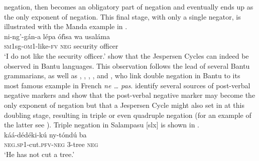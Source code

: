 \documentclass[output=paper]{langscibook}
\begin{document}
negation, then becomes an obligatory part of negation and eventually ends
up as the only exponent of negation. This final stage, with only a single
negator, is illustrated with the Manda example in
.  
\ea\label{ex:manda-security}
\\ 
\gll ni-ng'-g{\'a}n-a l{\'e}pa {{\'o}f{\'\i}sa wa usal{\'a}ma}\\
\textsc{sm1}sg-\textsc{om}1-like-\textsc{fv} \textsc{neg} {security
officer}\\ \glt `I do not like the security officer.' \z
\citet{DevosAuwera2013} show that the Jespersen Cycles can indeed be
observed in Bantu languages. This observation follows the lead of several
Bantu grammarians, as well as \citet[256--258]{Guldemann1996},
\citet[7]{GuldemannHagemeijer2006}, \citet[165]{Guldemann2008},
\citet[57]{Nurse2008}, and \citet[117]{Guldemann2011}, who link double
negation in Bantu to its most famous example in French \textit{ne \ldots{}
pas}. \citet{DevosAuwera2013} identify several sources of post-verbal
negative markers and show that the post-verbal negative marker may become
the only exponent of negation but that a Jespersen Cycle might also set in
at this doubling stage, resulting in triple or even quadruple negation (for
an example of the latter see \citealt{DevosTshibanda2010}). Triple negation
in Salampasu [slx] is shown in
.
\ea\label{ex:salampasu-cut} \\
\gll k{\'a}{\'a}-d{\'e}d{\'e}ki-k{\'u} ny-t{\'o}nd{\'u}  ba\\
\textsc{neg.sp}1-cut.\textsc{pfv-neg} 3-tree \textsc{neg}\\ \glt `He has
not cut a tree.' \z 
\end{document}
